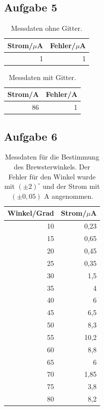 \documentclass[12pt]{scrartcl}
\begin{document}
\subsection{Aufgabe 5}

\begin{table}[H]
\caption{Messdaten ohne Gitter.}
\centering
\begin{tabular}{|l|l|}
\hline
Strom/$\mu$A & Fehler/$\mu$A \\ \hline
\multicolumn{1}{|r|}{1} & \multicolumn{1}{r|}{1} \\ \hline
\end{tabular}
\label{tab:a_5_o}
\end{table}

\begin{table}[H]
\caption{Messdaten mit Gitter.}
\centering
\begin{tabular}{|l|l|}
\hline
Strom/A & Fehler/A \\ \hline
\multicolumn{1}{|r|}{86} & \multicolumn{1}{r|}{1} \\ \hline
\end{tabular}
\label{tab:a_5_m}
\end{table}

\subsection{Aufgabe 6}

\begin{table}[H]
\caption{Messdaten für die Bestimmung des Brewsterwinkels. Der Fehler für den Winkel wurde mit $(\pm 2)^{\circ}$ und der Strom mit $(\pm 0,05)$ A angenommen.}
\centering
\begin{tabular}{|r|r|}
\hline
\multicolumn{1}{|l|}{Winkel/Grad} & \multicolumn{1}{l|}{Strom/$\mu$A} \\ \hline
10 & 0,23 \\ \hline
15 & 0,65 \\ \hline
20 & 0,45 \\ \hline
25 & 0,35 \\ \hline
30 & 1,5 \\ \hline
35 & 4 \\ \hline
40 & 6 \\ \hline
45 & 6,5 \\ \hline
50 & 8,3 \\ \hline
55 & 10,2 \\ \hline
60 & 8,8 \\ \hline
65 & 6 \\ \hline
70 & 1,85 \\ \hline
75 & 3,8 \\ \hline
80 & 8,2 \\ \hline
\end{tabular}
\label{tab:a_6}
\end{table}
\end{document}
